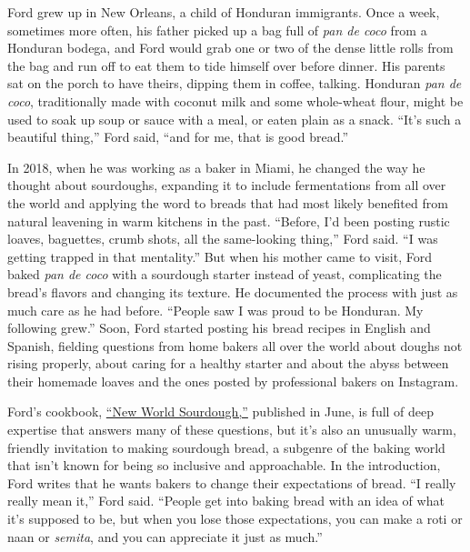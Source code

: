 Ford grew up in New Orleans, a child of Honduran immigrants. Once a
week, sometimes more often, his father picked up a bag full of \emph{pan
de coco} from a Honduran bodega, and Ford would grab one or two of the
dense little rolls from the bag and run off to eat them to tide himself
over before dinner. His parents sat on the porch to have theirs, dipping
them in coffee, talking. Honduran \emph{pan de coco}, traditionally made
with coconut milk and some whole-wheat flour, might be used to soak up
soup or sauce with a meal, or eaten plain as a snack. ``It's such a
beautiful thing,'' Ford said, ``and for me, that is good bread.''

In 2018, when he was working as a baker in Miami, he changed the way he
thought about sourdoughs, expanding it to include fermentations from all
over the world and applying the word to breads that had most likely
benefited from natural leavening in warm kitchens in the past. ``Before,
I'd been posting rustic loaves, baguettes, crumb shots, all the
same-looking thing,'' Ford said. ``I was getting trapped in that
mentality.'' But when his mother came to visit, Ford baked \emph{pan de
coco} with a sourdough starter instead of yeast, complicating the
bread's flavors and changing its texture. He documented the process with
just as much care as he had before. ``People saw I was proud to be
Honduran. My following grew.'' Soon, Ford started posting his bread
recipes in English and Spanish, fielding questions from home bakers all
over the world about doughs not rising properly, about caring for a
healthy starter and about the abyss between their homemade loaves and
the ones posted by professional bakers on Instagram.

Ford's cookbook, \href{https://www.artisanbryan.com/cookbook}{``New
World Sourdough,''} published in June, is full of deep expertise that
answers many of these questions, but it's also an unusually warm,
friendly invitation to making sourdough bread, a subgenre of the baking
world that isn't known for being so inclusive and approachable. In the
introduction, Ford writes that he wants bakers to change their
expectations of bread. ``I really really mean it,'' Ford said. ``People
get into baking bread with an idea of what it's supposed to be, but when
you lose those expectations, you can make a roti or naan or
\emph{semita}, and you can appreciate it just as much.''

